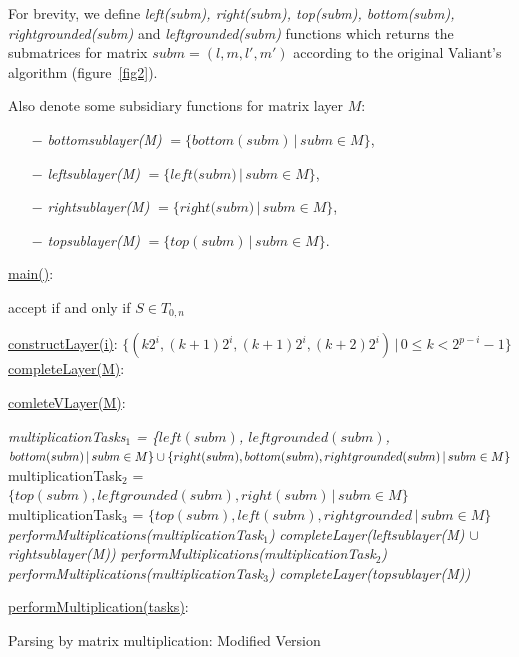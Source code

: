For brevity, we define \textit{left(subm), right(subm), top(subm), bottom(subm), \linebreak rightgrounded(subm)} and \textit{leftgrounded(subm)} functions which returns the submatrices for matrix $subm = (l, m, l', m')$ according to the original Valiant's algorithm (figure~\ref{fig2}).

Also denote some subsidiary functions for matrix layer $M$:
\begin{itemize}[noitemsep, nolistsep]
    \item[$-$] \textit{bottomsublayer(M)} $ = \{bottom(subm)\, |\,subm \in M \}$,
    \item[$-$] \textit{leftsublayer(M)} $ = \{\textit{left(subm)}\, |\,subm \in M \}$,
    \item[$-$] \textit{rightsublayer(M)} $ =\{\textit{right(subm)}\, |\,subm \in M \}$,
    \item[$-$] \textit{topsublayer(M)} $ = \{top(subm)\, |\,subm \in M \}$.
\end{itemize}

\begin{algorithm}[!h]
\SetAlgoNoLine
{}
\underline{main()}{:}{

 accept if and only if $S \in T_{0, n}$
 \BlankLine
 }

\underline{constructLayer(i)}{:}{
 \BlankLine
 $\{(k2^i, (k+1)2^i, (k + 1)2^i, (k+2)2^i) \, |\, 0 \le k < 2^{p - i} - 1\}$
 \BlankLine
    }
\underline{completeLayer(M)}{:}{
\BlankLine
{}
\BlankLine
}

\underline{comleteVLayer(M)}{:}{
 \BlankLine
 \textit{multiplicationTasks$_1$ = \linebreak
    \{$left(subm)$, $leftgrounded(subm)$, $bottom(subm)\, |\,subm \in M \} \cup \linebreak  \{right(subm), bottom(subm), rightgrounded(subm)\, |\,subm \in M\}$\;}
 \BlankLine
 multiplicationTask$_2$ = $\{top(subm), leftgrounded(subm), right(subm)\, |\,subm \in M\}$\;
 \BlankLine
 multiplicationTask$_3$ = $\{top(subm), left(subm), rightgrounded\, |\,subm \in M\}$\;
 \BlankLine
 \textit{performMultiplications(multiplicationTask$_1$)}\;
 \textit{completeLayer(leftsublayer(M) $\cup$ rightsublayer(M))}\;
 \textit{performMultiplications(multiplicationTask$_2$)}\;
 \textit{performMultiplications(multiplicationTask$_3$)}\;
 \textit{completeLayer(topsublayer(M))}

 }
 \BlankLine

 \underline{performMultiplication(tasks)}{:}{\\
 }

\caption{Parsing by matrix multiplication: Modified Version}
\label{algo:modified}
\end{algorithm}


